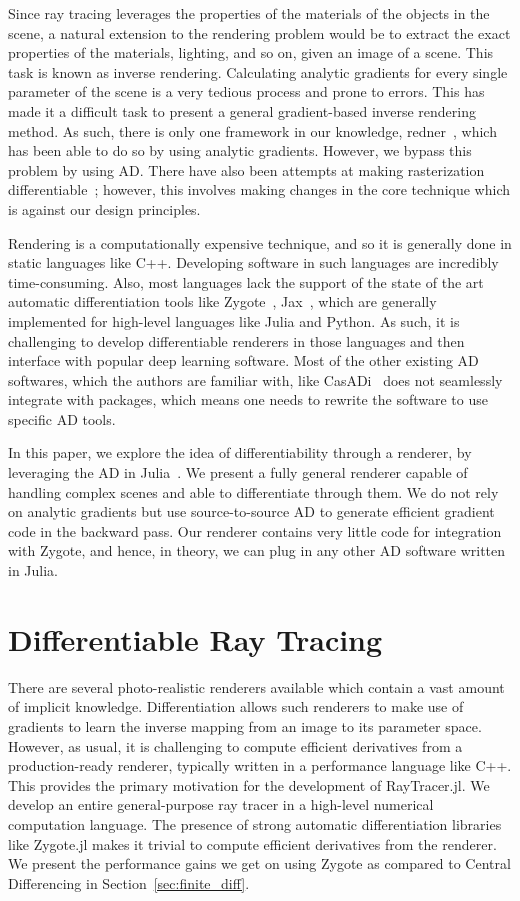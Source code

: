 \documentclass{juliacon}
\begin{document}
Since ray tracing leverages the properties of the materials of the objects in the scene, a natural extension to the rendering problem would be to extract the exact properties of the materials, lighting, and so on, given an image of a scene. This task is known as inverse rendering. Calculating analytic gradients for every single parameter of the scene is a very tedious process and prone to errors. This has made it a difficult task to present a general gradient-based inverse rendering method. As such, there is only one framework in our knowledge, redner~\cite{Li:2018:DMC}, which has been able to do so by using analytic gradients. However, we bypass this problem by using AD. There have also been attempts at making rasterization differentiable~\cite{softraster}; however, this involves making changes in the core technique which is against our design principles.

Rendering is a computationally expensive technique, and so it is generally done in static languages like C++. Developing software in such languages are incredibly time-consuming. Also, most languages lack the support of the state of the art automatic differentiation tools like Zygote~\cite{DBLP:journals/corr/abs-1810-07951}, Jax~\cite{jax}, which are generally implemented for high-level languages like Julia and Python. As such, it is challenging to develop differentiable renderers in those languages and then interface with popular deep learning software. Most of the other existing AD softwares, which the authors are familiar with, like CasADi~\cite{casadi} does not seamlessly integrate with packages, which means one needs to rewrite the software to use specific AD tools.

In this paper, we explore the idea of differentiability through a renderer, by leveraging the AD in Julia~\cite{bezanson2017julia}. We present a fully general renderer capable of handling complex scenes and able to differentiate through them. We do not rely on analytic gradients but use source-to-source AD to generate efficient gradient code in the backward pass. Our renderer contains very little code for integration with Zygote, and hence, in theory, we can plug in any other AD software written in Julia.

\section{Differentiable Ray Tracing}

There are several photo-realistic renderers available which contain a vast amount of implicit knowledge. Differentiation allows such renderers to make use of gradients to learn the inverse mapping from an image to its parameter space. However, as usual, it is challenging to compute efficient derivatives from a production-ready renderer, typically written in a performance language like C++. This provides the primary motivation for the development of RayTracer.jl. We develop an entire general-purpose ray tracer in a high-level numerical computation language. The presence of strong automatic differentiation libraries like Zygote.jl makes it trivial to compute efficient derivatives from the renderer. We present the performance gains we get on using Zygote as compared to Central Differencing in Section~\ref{sec:finite_diff}.
\end{document}
